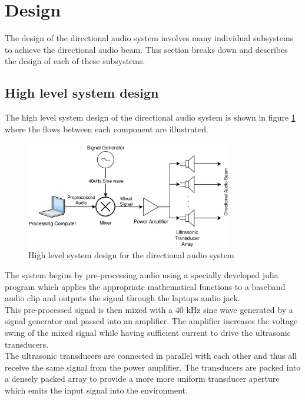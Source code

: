 \section{Design}
The design of the directional audio system involves many individual subsystems to achieve the directional audio beam. This section breaks down and describes the design of each of these subsystems.
\subsection{High level system design}
The high level system design of the directional audio system is shown in figure \ref{fig:highleveldesign} where the flows between each component are illustrated. 
\begin{figure}[h]
    \centering
    \includegraphics[width=0.8\textwidth]{Figures/Design/HighlevelSystemDesign.png}
    \caption{High level system design for the directional audio system}
    \label{fig:highleveldesign}
\end{figure}
The system begins by pre-processing audio using a specially developed julia program which applies the appropriate mathematical functions to a baseband audio clip and outputs the signal through the laptops audio jack.\\
This pre-processed signal is then mixed with a 40 kHz sine wave generated by a signal generator and passed into an amplifier. The amplifier increases the voltage swing of the mixed signal while having sufficient current to drive the ultrasonic transducers.\\
The ultrasonic transducers are connected in parallel with each other and thus all receive the same signal from the power amplifier. The transducers are packed into a densely packed array to provide a more more uniform transducer aperture which emits the input signal into the environment.

